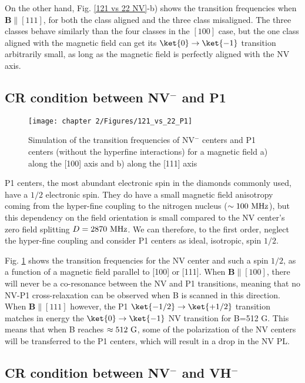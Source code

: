 \documentclass[a4paper,11pt]{report}
\begin{document}
\begin{refsection}
On the other hand, Fig. \ref{121 vs 22 NV}-b) shows the transition frequencies when $\mathbf{B} \parallel [111]$, for both the class aligned and the three class misaligned. The three classes behave similarly than the four classes in the $[100]$ case, but the one class aligned with the magnetic field can get its $\ket{0}\to\ket{-1}$ transition arbitrarily small, as long as the magnetic field is perfectly aligned with the NV axis.

\subsection{CR condition between NV$^-$ and P1}

\begin{figure}[h]
\centering
\texttt{[image: chapter 2/Figures/121\_vs\_22\_P1]}
\caption{Simulation of the transition frequencies of NV$^-$ centers and P1 centers (without the hyperfine interactions) for a magnetic field a) along the [100] axis and b) along the [111] axis}
\label{121 vs 22 P1}
\end{figure}

P1 centers, the most abundant electronic spin in the diamonds commonly used, have a $1/2$ electronic spin. They do have a small magnetic field anisotropy coming from the hyper-fine coupling to the nitrogen nucleus ($\sim 100\ \rm MHz$), but this dependency on the field orientation is small compared to the NV center's zero field splitting $D=2870\ \rm MHz$. We can therefore, to the first order, neglect the hyper-fine coupling and consider P1 centers as ideal, isotropic, spin $1/2$.

Fig. \ref{121 vs 22 P1} shows the transition frequencies for the NV center and such a spin $1/2$, as a function of a magnetic field parallel to [100] or [111]. When $\mathbf{B} \parallel [100]$, there will never be a co-resonance between the NV and P1 transitions, meaning that no NV-P1 cross-relaxation can be observed when B is scanned in this direction. When $\mathbf{B} \parallel [111]$ however, the P1 $\ket{-1/2} \to \ket{+1/2}$ transition matches in energy the $\ket{0}\to\ket{-1}$ NV transition for B=512 G. This means that when B reaches $\approx 512\ \rm G$, some of the polarization of the NV centers will be transferred to the P1 centers, which will result in a drop in the NV PL. 

\subsection{CR condition between NV$^-$ and VH$^-$}


\end{refsection}
\end{document}
